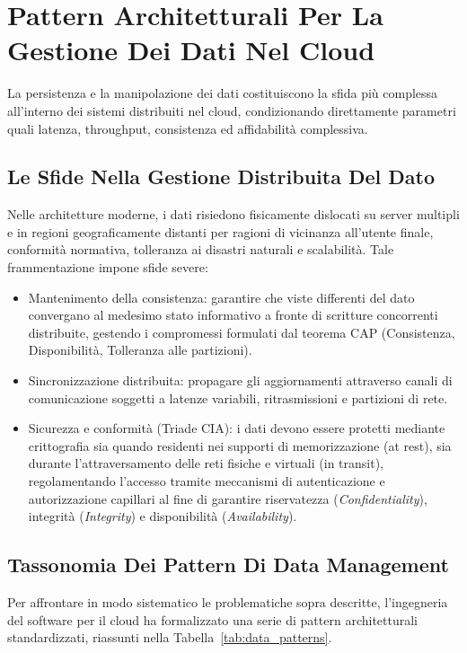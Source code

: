 \documentclass[11pt, a4paper]{article}
\begin{document}
\newpage

\section{Pattern Architetturali Per La Gestione Dei Dati Nel Cloud}

La persistenza e la manipolazione dei dati costituiscono la sfida più complessa all'interno dei sistemi distribuiti nel cloud, condizionando direttamente parametri quali latenza, throughput, consistenza ed affidabilità complessiva.

\subsection{Le Sfide Nella Gestione Distribuita Del Dato}

Nelle architetture moderne, i dati risiedono fisicamente dislocati su server multipli e in regioni geograficamente distanti per ragioni di vicinanza all'utente finale, conformità normativa, tolleranza ai disastri naturali e scalabilità. Tale frammentazione impone sfide severe:
\begin{itemize}[noitemsep]
    \item Mantenimento della consistenza: garantire che viste differenti del dato convergano al medesimo stato informativo a fronte di scritture concorrenti distribuite, gestendo i compromessi formulati dal teorema CAP (Consistenza, Disponibilità, Tolleranza alle partizioni).
    \item Sincronizzazione distribuita: propagare gli aggiornamenti attraverso canali di comunicazione soggetti a latenze variabili, ritrasmissioni e partizioni di rete.
    \item Sicurezza e conformità (Triade CIA): i dati devono essere protetti mediante crittografia sia quando residenti nei supporti di memorizzazione (at rest), sia durante l'attraversamento delle reti fisiche e virtuali (in transit), regolamentando l'accesso tramite meccanismi di autenticazione e autorizzazione capillari al fine di garantire riservatezza (\emph{Confidentiality}), integrità (\emph{Integrity}) e disponibilità (\emph{Availability}).
\end{itemize}

\subsection{Tassonomia Dei Pattern Di Data Management}

Per affrontare in modo sistematico le problematiche sopra descritte, l'ingegneria del software per il cloud ha formalizzato una serie di pattern architetturali standardizzati, riassunti nella Tabella~\ref{tab:data_patterns}.
\end{document}
